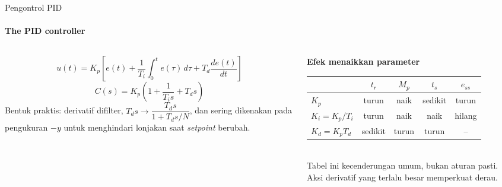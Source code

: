 \documentclass[aspectratio=169,10pt]{beamer}
\begin{document}
\begin{frame}{Pengontrol PID}
	\framesubtitle{The PID controller}
	\begin{columns}[T]
		\begin{column}{0.48\textwidth}
			\small
			\[
				u(t) = K_p\left[e(t) + \frac{1}{T_i}\int_0^t e(\tau)\,d\tau + T_d\frac{de(t)}{dt}\right]
			\]
			\[
				C(s) = K_p\left(1 + \frac{1}{T_i s} + T_d s\right)
			\]
			Bentuk praktis: derivatif difilter, $T_d s \rightarrow \dfrac{T_d s}{1 + T_d s/N}$, dan sering dikenakan pada pengukuran $-y$ untuk menghindari lonjakan saat \textit{setpoint} berubah.
		\end{column}
		\begin{column}{0.48\textwidth}
			\scriptsize
			\textbf{Efek menaikkan parameter} \\[2pt]
			\renewcommand{\arraystretch}{1.3}
			\begin{tabular}{@{}l c c c c@{}}
				\toprule
				 & $t_r$ & $M_p$ & $t_s$ & $e_{ss}$ \\
				\midrule
				$K_p$ & turun & naik & sedikit & turun \\
				$K_i = K_p/T_i$ & turun & naik & naik & hilang \\
				$K_d = K_pT_d$ & sedikit & turun & turun & -- \\
				\bottomrule
			\end{tabular}\\[4pt]
			Tabel ini kecenderungan umum, bukan aturan pasti. Aksi derivatif yang terlalu besar memperkuat derau.
		\end{column}
	\end{columns}
\end{frame}
\end{document}
